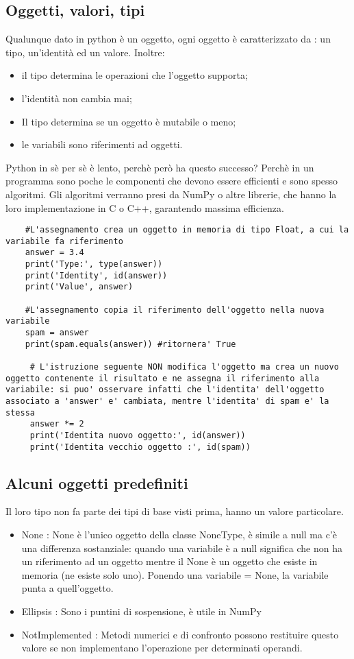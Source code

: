 \subsection{Oggetti, valori, tipi}

Qualunque dato in python è un oggetto, ogni oggetto è caratterizzato da : un tipo, un'identità ed un valore.
Inoltre:
\begin{itemize}
	\item il tipo determina le operazioni che l'oggetto supporta;
	\item l'identità non cambia mai;
	\item Il tipo determina se un oggetto è mutabile o meno;
	\item le variabili sono riferimenti ad oggetti.
\end{itemize}
Python in sè per sè è lento, perchè però ha questo successo? Perchè in un programma sono poche le componenti che devono essere efficienti e sono spesso algoritmi. Gli algoritmi verranno presi da NumPy o altre librerie, che hanno la loro implementazione in C o C++, garantendo massima efficienza.

\begin{lstlisting}
	#L'assegnamento crea un oggetto in memoria di tipo Float, a cui la variabile fa riferimento
	answer = 3.4
	print('Type:', type(answer))
	print('Identity', id(answer))
	print('Value', answer)
	
	#L'assegnamento copia il riferimento dell'oggetto nella nuova variabile
	spam = answer
	print(spam.equals(answer)) #ritornera' True
	 
	 # L'istruzione seguente NON modifica l'oggetto ma crea un nuovo oggetto contenente il risultato e ne assegna il riferimento alla variabile: si puo' osservare infatti che l'identita' dell'oggetto associato a 'answer' e' cambiata, mentre l'identita' di spam e' la stessa
	 answer *= 2
	 print('Identita nuovo oggetto:', id(answer))
	 print('Identita vecchio oggetto :', id(spam))
\end{lstlisting}

\subsection{Alcuni oggetti predefiniti}

Il loro tipo non fa parte dei tipi di base visti prima, hanno un valore particolare.

\begin{itemize}
	\item None : None è l'unico oggetto della classe NoneType, è simile a null ma c'è una differenza sostanziale: quando una variabile è a null significa che non ha un riferimento ad un oggetto mentre il None è un oggetto che esiste in memoria (ne esiste solo uno). Ponendo una variabile = None, la variabile punta a quell'oggetto.
	\item Ellipsis : Sono i puntini di sospensione, è utile in NumPy
	\item NotImplemented : Metodi numerici e di confronto possono restituire questo valore se non implementano l'operazione per determinati operandi.	
\end{itemize}

